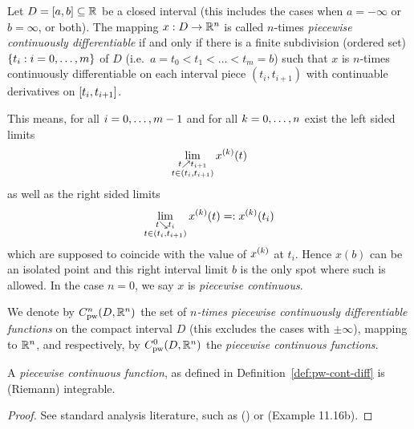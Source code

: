     \begin{definition}\label{def:pw-cont-diff}
        Let $D=[a,b]\subseteq\mathbb{R}$ be a closed interval (this includes the cases when $a=-\infty$ or $b=\infty$, or both). The mapping $x:D\rightarrow\mathbb{R}^n$ is called $n$-times \emph{piecewise continuously differentiable} if and only if there is a finite subdivision (ordered set) $\{t_i:i=0,\ldots,m\}$ of $D$ (i.e.\ $a=t_0<t_1<\ldots<t_m=b$) such that $x$ is $n$-times continuously differentiable on each interval piece $(t_i,t_{i+1})$ with continuable derivatives on $[t_i,t_{i+1}]$.

        This means, for all $i=0,\ldots,m-1$ and for all $k=0,\ldots,n$ exist the left sided limits
        \begin{equation}
            \lim_{\substack{t\upto t_{i+1}\\ t\in(t_i,t_{i+1})}} \D[k]{x}(t)
        \end{equation}
        as well as the right sided limits
        \begin{equation}
            \lim_{\substack{t\downto t_{i}\\ t\in(t_i,t_{i+1})}} \D[k]{x}(t) =: \D[k]{x}(t_i)
        \end{equation}
        which are supposed to coincide with the value of $\D[k]{x}$ at $t_i$.
        Hence $x(b)$ can be an isolated point and this right interval limit $b$ is the only spot where such is allowed.
        In the case $n=0$, we say $x$ is \emph{piecewise continuous}.

        We denote by $\Cnpw[n]{D}{\R^n}$ the set of \emph{$n$-times piecewise continuously differentiable functions} on the compact interval $D$ (this excludes the cases with $\pm\infty$), mapping to $\mathbb{R}^n$, and respectively, by $\Cnpw[0]{D}{\R^n}$ the \emph{piecewise continuous functions}.
    \end{definition}


    \begin{lemma}[]\label{lm:pc-integrable}
        A \emph{piecewise continuous function}, as defined in Definition~\ref{def:pw-cont-diff} is (Riemann) integrable.
    \end{lemma}
    \begin{proof}
        See standard analysis literature, such as \cite{Rudin76PrinciplesAnalysis} () or \cite{Gathmann12GDM} (Example 11.16b).
    \end{proof}

